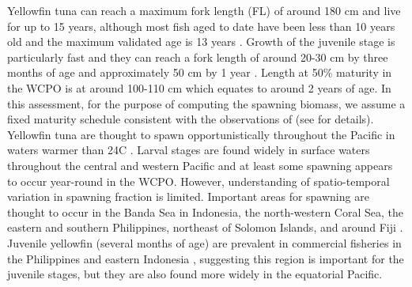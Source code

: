 Yellowfin tuna can reach a maximum fork length (FL) of around 180 cm and live for up to 15 years, although most fish aged to date have been less than 10 years old \citep{itano_reproductive_2000,farley_age_2020} and the maximum validated age is 13 years \citep{andrews_final_2022}. Growth of the juvenile stage is particularly fast and they can reach a fork length of around 20-30 cm by three months of age and approximately 50 cm by 1 year \citep{farley_age_2020}. Length at 50\% maturity in the WCPO is at around 100-110 cm \citep{itano_reproductive_2000} which equates to around 2 years of age. In this assessment, for the purpose of computing the spawning biomass, we assume a fixed maturity schedule consistent with the observations of \citet{itano_reproductive_2000} (see \citealp{vincent_background_2020} for details). Yellowfin tuna are thought to spawn opportunistically throughout the Pacific in waters warmer than 24\degree C \citep{itano_reproductive_2000,reglero_worldwide_2014}. Larval stages are found widely in surface waters throughout the central and western Pacific \citep{nishikawa_average_1985,servidad-bacordo_composition_2012,ijima_tuna_2023} and at least some spawning appears to occur year-round in the WCPO. However, understanding of spatio-temporal variation in spawning fraction is limited. Important areas for spawning are thought to occur in the Banda Sea in Indonesia, the north-western Coral Sea, the eastern and southern Philippines, northeast of Solomon Islands, and around Fiji \citep{mcpherson_reproductive_1991,gunn_origin_2002,servidad-bacordo_composition_2012,ijima_tuna_2023}. Juvenile yellowfin (several months of age) are prevalent in commercial fisheries in the Philippines and eastern Indonesia \citep{hare_compendium_2023,williams_overview_2023}, suggesting this region is important for the juvenile stages, but they are also found more widely in the equatorial Pacific.


